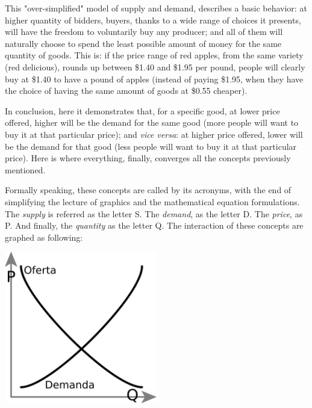 \documentclass[12pt,a4paper,twoside]{book}
\begin{document}
This "over-simplified" model of supply and demand, describes a basic behavior: at higher quantity of bidders, buyers, thanks to a wide range of choices it presents, will have the freedom to voluntarily buy any producer; and all of them will naturally choose to spend the least possible amount of money for the same quantity of goods. This is: if the price range of red apples, from the same variety (red delicious), rounds up between \$1.40 and \$1.95 per pound, people will clearly buy at \$1.40 to have a pound of apples (instead of paying \$1.95, when they have the choice of having the same amount of goods at \$0.55 cheaper).

In conclusion, here it demonstrates that, for a specific good, at lower price offered, higher will be the demand for the same good (more people will want to buy it at that particular price); and \textit{vice versa}: at higher price offered, lower will be the demand for that good (less people will want to buy it at that particular price). Here is where everything, finally, converges all the concepts previously mentioned.

Formally speaking, these concepts are called by its acronyms, with the end of simplifying the lecture of graphics and the mathematical equation formulations. The \textit{supply} is referred as the letter S. The \textit{demand}, as the letter D. The \textit{price}, as P. And finally, the \textit{quantity} as the letter Q. The interaction of these concepts are graphed as following:

\begin{center}
\includegraphics[width=0.5\textwidth]{img/leyofertademanda.png}
\end{center}
\end{document}
